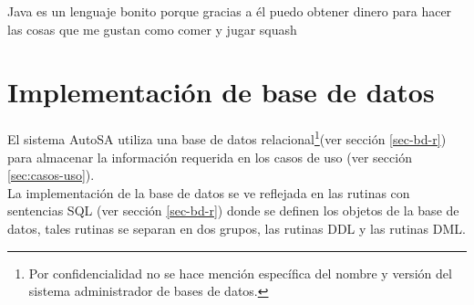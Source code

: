 Java es un lenguaje bonito porque gracias a él  puedo obtener dinero para hacer las cosas que me gustan como comer  y jugar squash
\fi


\section{Implementación de base de datos}
El sistema AutoSA utiliza una base de datos relacional\footnote{Por confidencialidad no se hace mención específica del nombre y versión del sistema administrador de bases de datos.}(ver sección \ref{sec-bd-r}) para almacenar la información requerida en los casos de uso (ver sección \ref{sec:casos-uso}).\\
La implementación de la base de datos se ve reflejada en las rutinas con sentencias SQL (ver sección \ref{sec-bd-r}) donde se definen los objetos de la base de datos, tales rutinas se separan en dos grupos, las rutinas DDL y las rutinas DML.

